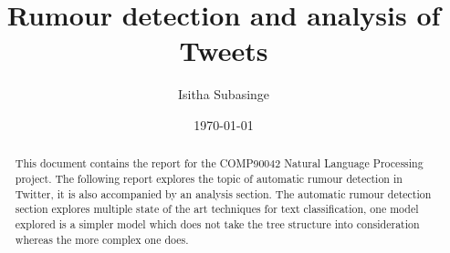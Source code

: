 \documentclass[11pt,a4paper]{article}
\title{Rumour detection and analysis of Tweets}
\author{Isitha Subasinge}
\date{\today}
\begin{document}
\maketitle

\begin{abstract}
This document contains the report for the COMP90042 Natural Language Processing project. The following report explores 
the topic of automatic rumour detection in Twitter, it is also accompanied by an analysis section. The automatic rumour detection section
explores multiple state of the art techniques for text classification, one model explored is a simpler model which does not take the tree structure into consideration
whereas the more complex one does.
\end{abstract}









\nocite{burchell}
\nocite{ma_gao_wong_2018}
\nocite{baris_schmelzeisen_staab_2019}
\nocite{Gardner2017AllenNLP}




\end{document}
